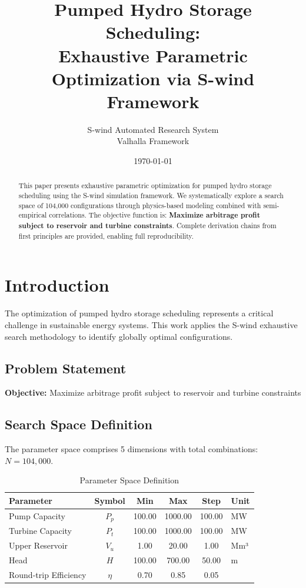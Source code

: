 \documentclass[11pt,twocolumn]{article}
\title{Pumped Hydro Storage Scheduling: \\Exhaustive Parametric Optimization via S-wind Framework}
\author{S-wind Automated Research System\\Valhalla Framework}
\date{\today}
\begin{document}
\maketitle

\begin{abstract}
This paper presents exhaustive parametric optimization for pumped hydro storage scheduling using the S-wind simulation framework.
We systematically explore a search space of 104,000 configurations through physics-based modeling
combined with semi-empirical correlations. The objective function is: \textbf{Maximize arbitrage profit subject to reservoir and turbine constraints}.
Complete derivation chains from first principles are provided, enabling full reproducibility.
\end{abstract}

\section{Introduction}
The optimization of pumped hydro storage scheduling represents a critical challenge in sustainable energy systems.
This work applies the S-wind exhaustive search methodology to identify globally optimal configurations.

\subsection{Problem Statement}
\textbf{Objective:} Maximize arbitrage profit subject to reservoir and turbine constraints

\subsection{Search Space Definition}
The parameter space comprises 5 dimensions with total combinations: $N = 104,000$.

\begin{table}[h]
\centering
\caption{Parameter Space Definition}
\begin{tabular}{@{}lccccl@{}}
\toprule
Parameter & Symbol & Min & Max & Step & Unit \\
\midrule
Pump Capacity & $P_p$ & 100.00 & 1000.00 & 100.00 & MW \\
Turbine Capacity & $P_t$ & 100.00 & 1000.00 & 100.00 & MW \\
Upper Reservoir & $V_u$ & 1.00 & 20.00 & 1.00 & Mm³ \\
Head & $H$ & 100.00 & 700.00 & 50.00 & m \\
Round-trip Efficiency & $\eta$ & 0.70 & 0.85 & 0.05 &  \\
\bottomrule
\end{tabular}
\end{table}
\end{document}
